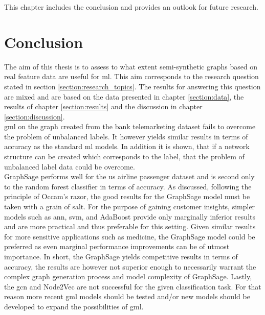 
  This chapter includes the conclusion and provides an outlook for future
  research.

  \section{Conclusion}
  \label{section:conclusion}

  The aim of this thesis is to assess to what extent semi-synthetic graphs based 
  on real feature data are useful for \acs{ml}. This aim corresponds to
  the research question stated in section \ref{section:research_topics}. The
  results for answering this question are mixed and are based on the data
  presented in chapter \ref{section:data}, the results of chapter
  \ref{section:results} and the discussion in chapter \ref{section:discussion}.
  \\

  \noindent \acs{gml} on the graph created from the bank telemarketing dataset 
  fails to overcome the problem of unbalanced labels. It however yields similar 
  results in terms of accuracy as the standard \acs{ml} models. In addition it 
  is shown, that if a network structure can be created which corresponds to the 
  label, that the problem of unbalanced label data could be overcome. \\

  \noindent GraphSage performs well for the \acs{us} airline passenger dataset 
  and is second only to the random forest classifier in terms of accuracy. As
  discussed, following the principle of Occam's razor, the good results for the
  GraphSage model must be taken with a grain of salt. For the purpose of
  gaining customer insights, simpler models such as \acs{ann}, \acs{svm}, and 
  AdaBoost provide only marginally inferior results and are more practical and 
  thus preferable for this setting. Given similar results for more sensitive 
  applications such as medicine, the GraphSage model could be preferred as even 
  marginal performance improvements can be of utmost importance. In short, the 
  GraphSage yields competitive results in terms of accuracy, the results are 
  however not superior enough to necessarily warrant the complex graph 
  generation process and model complexity of GraphSage. Lastly, the 
  \acs{gcn} and Node2Vec are not successful for the given classification task. 
  For that reason more recent \acs{gml} models should be tested and/or new 
  models should be developed to expand the possibilities of \acs{gml}.\\

